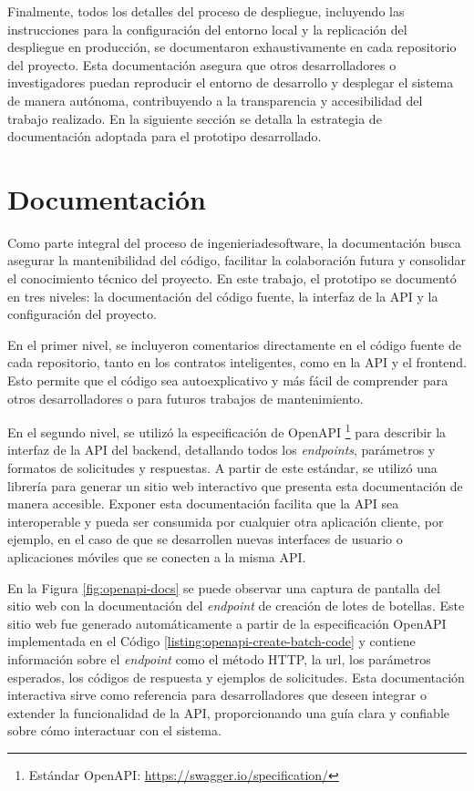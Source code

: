 Finalmente, todos los detalles del proceso de despliegue, incluyendo las instrucciones para la configuración del entorno local y la replicación del despliegue en producción, se documentaron exhaustivamente en cada repositorio del proyecto. Esta documentación asegura que otros desarrolladores o investigadores puedan reproducir el entorno de desarrollo y desplegar el sistema de manera autónoma, contribuyendo a la transparencia y accesibilidad del trabajo realizado. En la siguiente sección se detalla la estrategia de documentación adoptada para el prototipo desarrollado.

\section{Documentación}
\label{sec:documentation}

Como parte integral del proceso de \gls{ingenieriadesoftware}, la documentación busca asegurar la mantenibilidad del código, facilitar la colaboración futura y consolidar el conocimiento técnico del proyecto. En este trabajo, el prototipo se documentó en tres niveles: la documentación del código fuente, la interfaz de la API y la configuración del proyecto.

En el primer nivel, se incluyeron comentarios directamente en el código fuente de cada repositorio, tanto en los contratos inteligentes, como en la API y el \gls{frontend}. Esto permite que el código sea autoexplicativo y más fácil de comprender para otros desarrolladores o para futuros trabajos de mantenimiento. 

En el segundo nivel, se utilizó la especificación de OpenAPI \footnote{Estándar OpenAPI: \url{https://swagger.io/specification/}} para describir la interfaz de la API del \gls{backend}, detallando todos los \textit{endpoints}, parámetros y formatos de solicitudes y respuestas. A partir de este estándar, se utilizó una librería para generar un sitio web interactivo que presenta esta documentación de manera accesible. Exponer esta documentación facilita que la API sea interoperable y pueda ser consumida por cualquier otra aplicación cliente, por ejemplo, en el caso de que se desarrollen nuevas interfaces de usuario o aplicaciones móviles que se conecten a la misma API. 

En la Figura \ref{fig:openapi-docs} se puede observar una captura de pantalla del sitio web con la documentación del \textit{\gls{endpoint}} de creación de lotes de botellas. Este sitio web fue generado automáticamente a partir de la especificación OpenAPI implementada en el Código \ref{listing:openapi-create-batch-code} y contiene información sobre el \textit{endpoint} como el método HTTP, la \gls{url}, los parámetros esperados, los códigos de respuesta y ejemplos de solicitudes. Esta documentación interactiva sirve como referencia para desarrolladores que deseen integrar o extender la funcionalidad de la API, proporcionando una guía clara y confiable sobre cómo interactuar con el sistema.

